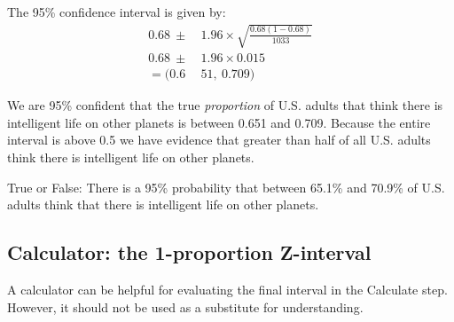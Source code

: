 \begin{examplewrap}
\begin{nexample}
\begin{description}
The 95\% confidence interval is given by:
\begin{align*}
0.68\ \pm\  &1.96 \times \sqrt{\frac{0.68(1-0.68)}{1033}} \\
0.68\ \pm\  &1.96 \times 0.015 \\
 = (0.6&51,\  0.709)
\end{align*}
\item[\inferencestep{Conclude}]  We are 95\%  confident that the true \emph{proportion} of U.S. adults that think there is intelligent life on other planets is between 0.651 and 0.709. Because the entire interval is above 0.5 we have evidence that greater than half of all U.S. adults think there is intelligent life on other planets.
\end{description}
\end{nexample}
\end{examplewrap}

\begin{exercisewrap}
\begin{nexercise}
True or False:  There is a 95\% probability that between 65.1\% and 70.9\% of U.S. adults think that there is intelligent life on other planets.\footnotemark
\end{nexercise}
\end{exercisewrap}


\D{\newpage}

\subsection{Calculator:  the 1-proportion Z-interval}
A calculator can be helpful for evaluating the final interval in the Calculate step.  However, it should not be used as a substitute for understanding.  
\label{1PropZInt}

